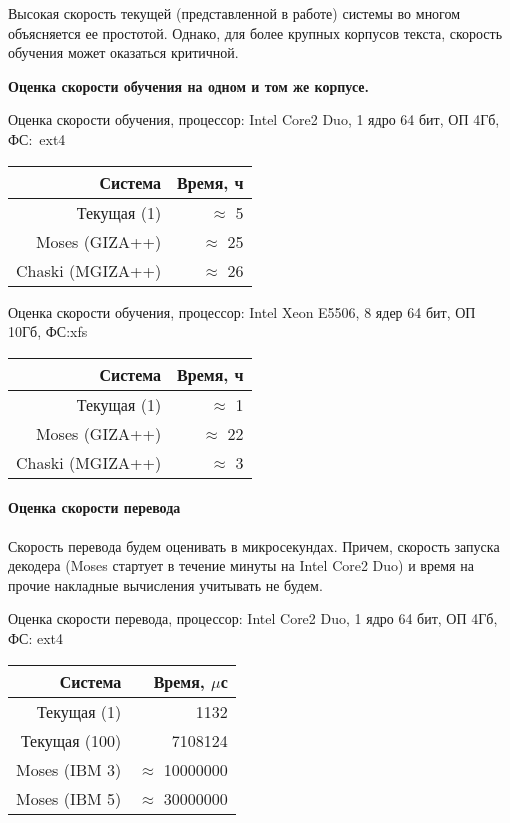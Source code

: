 Высокая скорость текущей (представленной в работе) системы 
во многом объясняется ее простотой. 
Однако, для более крупных корпусов текста, скорость обучения может оказаться критичной.

\textbf{Оценка скорости обучения на одном и том же корпусе.} \\

\begin{dtable}{Оценка скорости обучения, процессор: Intel Core2 Duo, 1 ядро 64 бит, ОП 4Гб, ФС:~ext4}
	\begin{tabular}{|r|r|}
		\hline  \textbf{Система}		& \textbf{Время, ч} \\  
		\hline  Текущая (1)				&	$ \approx $ 5   \\ 
		\hline  Moses (GIZA++)			&	$ \approx $ 25  \\ 
		\hline  Chaski (MGIZA++)		&	$ \approx $ 26  \\ 
		\hline 
	\end{tabular} 
\end{dtable}

\begin{dtable}{Оценка скорости обучения, процессор: Intel Xeon E5506, 8 ядер 64 бит, ОП 10Гб, ФС:xfs}
	\begin{tabular}{|r|r|}
		\hline  \textbf{Система}	& \textbf{Время, ч} \\ 
		\hline  Текущая (1)			&	$ \approx $ 1 	\\
		\hline  Moses (GIZA++)		&	$ \approx $ 22 	\\
		\hline  Chaski (MGIZA++)	&	$ \approx $ 3 	\\ 
		\hline 
	\end{tabular} 
\end{dtable}

\paragraph{Оценка скорости перевода}

Скорость перевода будем оценивать в микросекундах. 
Причем, скорость запуска декодера (Moses стартует в течение минуты на Intel Core2 Duo) 
и время на прочие накладные вычисления учитывать не будем. \\

\begin{dtable}{Оценка скорости перевода, процессор: Intel Core2 Duo, 1 ядро 64 бит, ОП 4Гб, ФС: ext4}
	\begin{tabular}{|r|r|}
		\hline  \textbf{Система}	&	Время, $\mu$с \\ 
		\hline  Текущая (1)			&	1132 \\ 
		\hline  Текущая (100)		&	7108124  \\ 
		\hline  Moses (IBM 3)		&	$\approx$ 10000000\\ 
		\hline  Moses (IBM 5) 		& 	$\approx$ 30000000 \\ 
		\hline 
	\end{tabular} 
\end{dtable}

